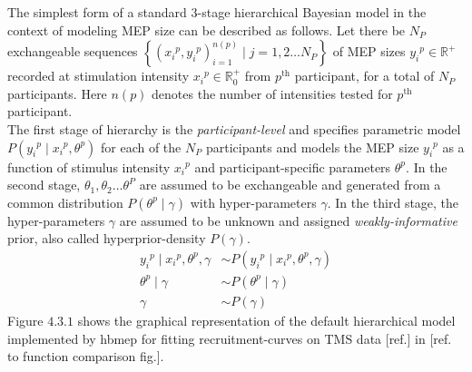\documentclass[a4paper,12pt]{article}
\begin{document}
The simplest form of a standard 3-stage hierarchical Bayesian model in the context of modeling MEP size can be described as follows. Let there be $N_P$ exchangeable sequences $\left\{\left({x_i}^p, {y_i}^p\right)_{i=1}^{n(p)} \mid j = 1, 2 \ldots N_P\right\}$ of MEP sizes ${y_i}^p \in \mathbb{R}^+$ recorded at stimulation intensity ${x_i}^p \in \mathbb{R}_0^+$ from $p^{\text{th}}$ participant, for  a total of $N_P$ participants. Here $n(p)$ denotes the number of intensities tested for $p^{\text{th}}$ participant.\\

The first stage of hierarchy is the \textit{participant-level} and specifies parametric model $P\left({y_i}^p \mid {x_i}^p, \theta^p\right)$ for each of the $N_P$ participants and models the MEP size ${y_i}^p$ as a function of stimulus intensity ${x_i}^p$ and participant-specific parameters $\theta^p$. In the second stage, $\theta_1, \theta_2 \ldots \theta^P$ are assumed to be exchangeable and generated from a common distribution $P\left(\theta^p \mid \gamma\right)$ with hyper-parameters $\gamma$. In the third stage, the hyper-parameters $\gamma$ are assumed to be unknown and assigned \textit{weakly-informative} prior, also called hyperprior-density $P\left(\gamma\right)$.
\begin{align*}
{y_i}^p \mid {x_i}^p, \theta^p, \gamma &\sim P\left({y_i}^p \mid {x_i}^p, \theta^p, \gamma\right) \tag{4.2.1} \\
\theta^p \mid \gamma &\sim P\left(\theta^p \mid \gamma\right) \tag{4.2.2} \\
\gamma &\sim P\left(\gamma\right) \tag{4.2.3}
\end{align*}
Figure $4.3.1$ shows the graphical representation of the default hierarchical model implemented by hbmep for fitting recruitment-curves on TMS data [ref.] in [ref. to function comparison fig.].\\
\end{document}

